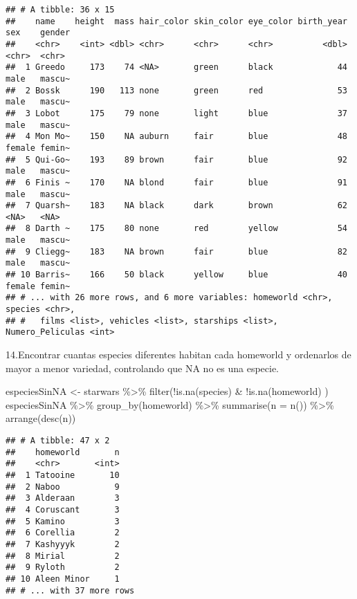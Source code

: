 \documentclass[
]{book}
\newenvironment{Shaded}{\begin{snugshade}}{\end{snugshade}}
\newcommand{\AttributeTok}[1]{\textcolor[rgb]{0.77,0.63,0.00}{#1}}
\newcommand{\FunctionTok}[1]{\textcolor[rgb]{0.00,0.00,0.00}{#1}}
\newcommand{\NormalTok}[1]{#1}
\newcommand{\OtherTok}[1]{\textcolor[rgb]{0.56,0.35,0.01}{#1}}
\newcommand{\SpecialCharTok}[1]{\textcolor[rgb]{0.00,0.00,0.00}{#1}}
\begin{document}
\begin{verbatim}
## # A tibble: 36 x 15
##    name    height  mass hair_color skin_color eye_color birth_year sex    gender
##    <chr>    <int> <dbl> <chr>      <chr>      <chr>          <dbl> <chr>  <chr> 
##  1 Greedo     173    74 <NA>       green      black             44 male   mascu~
##  2 Bossk      190   113 none       green      red               53 male   mascu~
##  3 Lobot      175    79 none       light      blue              37 male   mascu~
##  4 Mon Mo~    150    NA auburn     fair       blue              48 female femin~
##  5 Qui-Go~    193    89 brown      fair       blue              92 male   mascu~
##  6 Finis ~    170    NA blond      fair       blue              91 male   mascu~
##  7 Quarsh~    183    NA black      dark       brown             62 <NA>   <NA>  
##  8 Darth ~    175    80 none       red        yellow            54 male   mascu~
##  9 Cliegg~    183    NA brown      fair       blue              82 male   mascu~
## 10 Barris~    166    50 black      yellow     blue              40 female femin~
## # ... with 26 more rows, and 6 more variables: homeworld <chr>, species <chr>,
## #   films <list>, vehicles <list>, starships <list>, Numero_Peliculas <int>
\end{verbatim}

14.Encontrar cuantas especies diferentes habitan cada homeworld y ordenarlos de mayor a menor variedad, controlando que NA no es una especie.

\begin{Shaded}
\begin{Highlighting}[]
\NormalTok{especiesSinNA }\OtherTok{\textless{}{-}}\NormalTok{ starwars }\SpecialCharTok{\%\textgreater{}\%} \FunctionTok{filter}\NormalTok{(}\SpecialCharTok{!}\FunctionTok{is.na}\NormalTok{(species) }\SpecialCharTok{\&} \SpecialCharTok{!}\FunctionTok{is.na}\NormalTok{(homeworld) )}
\NormalTok{especiesSinNA }\SpecialCharTok{\%\textgreater{}\%} \FunctionTok{group\_by}\NormalTok{(homeworld) }\SpecialCharTok{\%\textgreater{}\%} \FunctionTok{summarise}\NormalTok{(}\AttributeTok{n =} \FunctionTok{n}\NormalTok{()) }\SpecialCharTok{\%\textgreater{}\%} \FunctionTok{arrange}\NormalTok{(}\FunctionTok{desc}\NormalTok{(n))}
\end{Highlighting}
\end{Shaded}

\begin{verbatim}
## # A tibble: 47 x 2
##    homeworld       n
##    <chr>       <int>
##  1 Tatooine       10
##  2 Naboo           9
##  3 Alderaan        3
##  4 Coruscant       3
##  5 Kamino          3
##  6 Corellia        2
##  7 Kashyyyk        2
##  8 Mirial          2
##  9 Ryloth          2
## 10 Aleen Minor     1
## # ... with 37 more rows
\end{verbatim}
\end{document}
